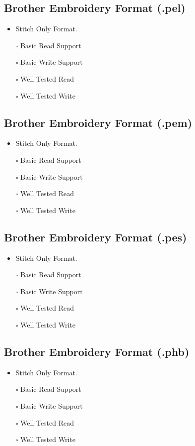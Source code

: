 \documentclass[onesize, a4paper]{refart}
\providecommand{\tightlist}{\setlength{\itemsep}{0pt}\setlength{\parskip}{0pt}}
\begin{document}
\subsection{Brother Embroidery Format (.pel)}

\begin{itemize}
\tightlist
\item Stitch Only Format.
\item[$\square$] Basic Read Support
\item[$\square$] Basic Write Support
\item[$\square$] Well Tested Read
\item[$\square$] Well Tested Write
\end{itemize}

\subsection{Brother Embroidery Format (.pem)}

\begin{itemize}
\tightlist
\item Stitch Only Format.
\item[$\square$] Basic Read Support
\item[$\square$] Basic Write Support
\item[$\square$] Well Tested Read
\item[$\square$] Well Tested Write
\end{itemize}

\subsection{Brother Embroidery Format (.pes)}

\begin{itemize}
\tightlist
\item Stitch Only Format.
\item[$\square$] Basic Read Support
\item[$\square$] Basic Write Support
\item[$\square$] Well Tested Read
\item[$\square$] Well Tested Write
\end{itemize}

\subsection{Brother Embroidery Format (.phb)}

\begin{itemize}
\tightlist
\item Stitch Only Format.
\item[$\square$] Basic Read Support
\item[$\square$] Basic Write Support
\item[$\square$] Well Tested Read
\item[$\square$] Well Tested Write
\end{itemize}
\end{document}
